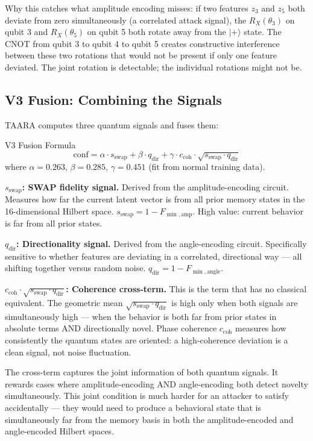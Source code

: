 \documentclass[11pt,a4paper]{article}
\begin{document}
Why this catches what amplitude encoding misses: if two features $z_3$ and $z_5$ both deviate from zero simultaneously (a correlated attack signal), the $R_X(\theta_3)$ on qubit 3 and $R_X(\theta_5)$ on qubit 5 both rotate away from the $|+\rangle$ state. The CNOT from qubit 3 to qubit 4 to qubit 5 creates constructive interference between these two rotations that would not be present if only one feature deviated. The joint rotation is detectable; the individual rotations might not be.

\subsection{V3 Fusion: Combining the Signals}

TAARA computes three quantum signals and fuses them:

\begin{mathblock}{V3 Fusion Formula}
\[
\text{conf} = \alpha \cdot s_{\text{swap}} + \beta \cdot q_{\text{dir}} + \gamma \cdot c_{\text{coh}} \cdot \sqrt{s_{\text{swap}} \cdot q_{\text{dir}}} \tag{5}
\]
where $\alpha = 0.263$, $\beta = 0.285$, $\gamma = 0.451$ (fit from normal training data).
\end{mathblock}

\textbf{$s_{\text{swap}}$: SWAP fidelity signal.} Derived from the amplitude-encoding circuit. Measures how far the current latent vector is from all prior memory states in the 16-dimensional Hilbert space. $s_{\text{swap}} = 1 - F_{\min,\text{amp}}$. High value: current behavior is far from all prior states.

\textbf{$q_{\text{dir}}$: Directionality signal.} Derived from the angle-encoding circuit. Specifically sensitive to whether features are deviating in a correlated, directional way — all shifting together versus random noise. $q_{\text{dir}} = 1 - F_{\min,\text{angle}}$.

\textbf{$c_{\text{coh}} \cdot \sqrt{s_{\text{swap}} \cdot q_{\text{dir}}}$: Coherence cross-term.} This is the term that has no classical equivalent. The geometric mean $\sqrt{s_{\text{swap}} \cdot q_{\text{dir}}}$ is high only when both signals are simultaneously high — when the behavior is both far from prior states in absolute terms AND directionally novel. Phase coherence $c_{\text{coh}}$ measures how consistently the quantum states are oriented: a high-coherence deviation is a clean signal, not noise fluctuation.

The cross-term captures the joint information of both quantum signals. It rewards cases where amplitude-encoding AND angle-encoding both detect novelty simultaneously. This joint condition is much harder for an attacker to satisfy accidentally — they would need to produce a behavioral state that is simultaneously far from the memory basis in both the amplitude-encoded and angle-encoded Hilbert spaces.
\end{document}
